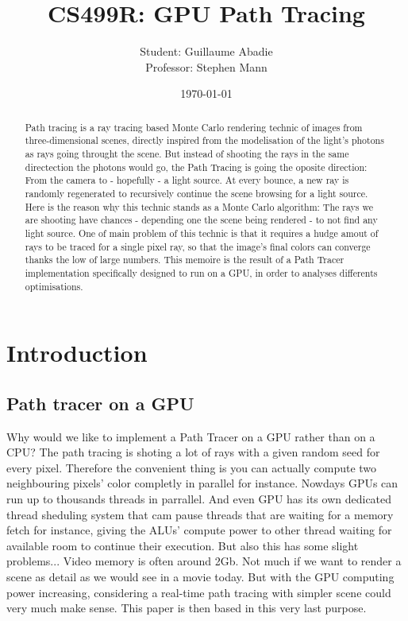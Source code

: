 \documentclass[10pt,twocolumn,a4paper]{article}
\begin{document}
\title{CS499R: GPU Path Tracing}
\author{
    Student: Guillaume Abadie\\
    Professor: Stephen Mann
}
\date{\today}
\maketitle

\begin{abstract}

Path tracing is a ray tracing based Monte Carlo rendering technic of images from
three-dimensional scenes, directly inspired from the modelisation of the light's
photons as rays going throught the scene. But instead of shooting the rays in the
same directection the photons would go, the Path Tracing is going the oposite
direction: From the camera to - hopefully - a light source. At every bounce, a new
ray is randomly regenerated to recursively continue the scene browsing for a
light source. Here is the reason why this technic stands as a Monte Carlo
algorithm: The rays we are shooting have chances - depending one the scene
being rendered - to not find any light source. One of main problem of this
technic is that it requires a hudge
amout of rays to be traced for a single pixel ray, so that the image's final
colors can converge thanks the low of large numbers. This memoire is the result
of a Path Tracer implementation
specifically designed to run on a GPU, in order to analyses differents
optimisations.

\end{abstract}

\section{Introduction}
\subsection{Path tracer on a GPU}
Why would we like to implement a Path Tracer on a GPU rather than on a CPU?
The path tracing is shoting a lot of rays with a given random seed
for every pixel. Therefore the convenient thing is you can actually
compute two neighbouring pixels' color completly in parallel for instance.
Nowdays GPUs can run up to thousands threads in parrallel. And even GPU has
its own dedicated thread sheduling system that cam pause threads that are
waiting for a memory fetch for instance, giving the ALUs' compute power to
other thread waiting for available room to continue their execution. But also
this has some slight problems... Video memory is often around 2Gb. Not much if
we want to render a scene as detail as we would see in a movie today. But with
the GPU computing power increasing, considering a real-time path tracing with
simpler scene could very much make sense. This paper is then based in this
very last purpose.
\end{document}
